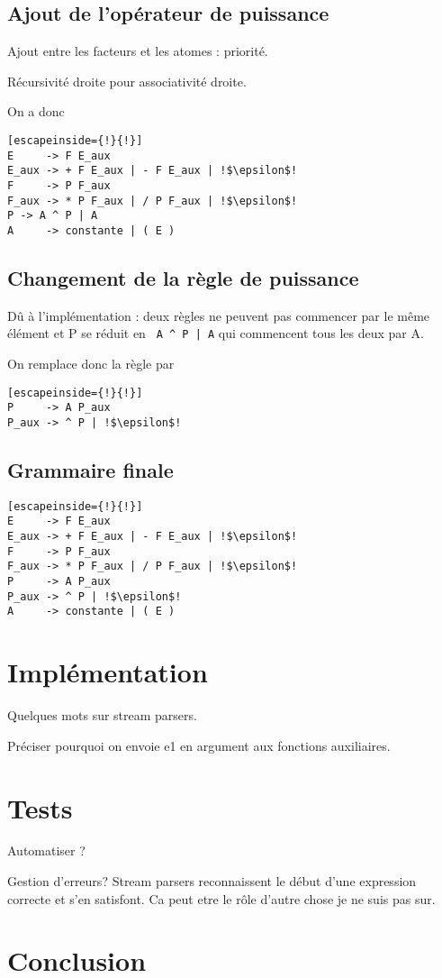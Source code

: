 \documentclass[11pt]{article}
\begin{document}
\subsection{Ajout de l'opérateur de puissance}
Ajout entre les facteurs et les atomes : priorité.

Récursivité droite pour associativité droite.

On a donc 
\begin{lstlisting}[escapeinside={!}{!}]
E     -> F E_aux
E_aux -> + F E_aux | - F E_aux | !$\epsilon$!
F     -> P F_aux
F_aux -> * P F_aux | / P F_aux | !$\epsilon$!
P -> A ^ P | A
A     -> constante | ( E )
\end{lstlisting}

\subsection{Changement de la règle de puissance}
Dû à l'implémentation : deux règles ne peuvent pas commencer par le même élément et P se réduit en \lstinline{ A ^ P | A} qui commencent tous les deux par A.

On remplace donc la règle par 
\begin{lstlisting}[escapeinside={!}{!}]
P     -> A P_aux
P_aux -> ^ P | !$\epsilon$!
\end{lstlisting}

\subsection{Grammaire finale}
\begin{lstlisting}[escapeinside={!}{!}]
E     -> F E_aux
E_aux -> + F E_aux | - F E_aux | !$\epsilon$!
F     -> P F_aux
F_aux -> * P F_aux | / P F_aux | !$\epsilon$!
P     -> A P_aux
P_aux -> ^ P | !$\epsilon$!
A     -> constante | ( E )
\end{lstlisting}
 

\section{Implémentation}
Quelques mots sur stream parsers.

Préciser pourquoi on envoie e1 en argument aux fonctions auxiliaires.

\section{Tests}
Automatiser ?

Gestion d'erreurs? Stream parsers reconnaissent le début d'une expression correcte et s'en satisfont. Ca peut etre le rôle d'autre chose je ne suis pas sur.

\section{Conclusion}
\end{document}

